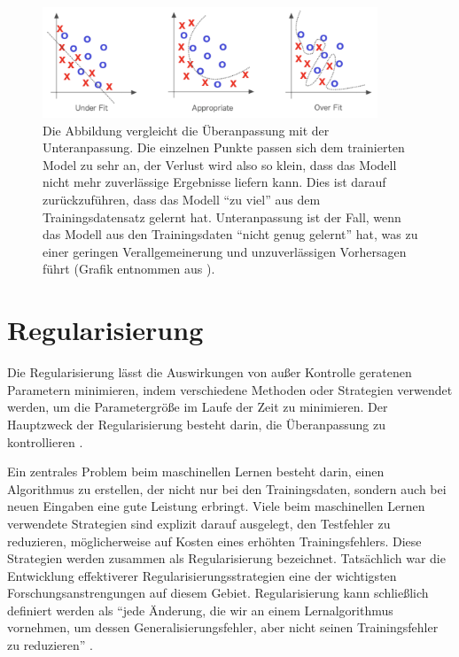         \begin{figure}[H]
            \centering
            \includegraphics[width=10cm]{kapitel2/overundefit.png}
            \caption[Vergleich der Unteranpassung mit der Überanpassung]{Die Abbildung vergleicht die Überanpassung mit der Unteranpassung. Die einzelnen Punkte passen sich dem trainierten Model zu sehr an, der Verlust wird also so klein, dass das Modell nicht mehr zuverlässige Ergebnisse liefern kann. Dies ist darauf zurückzuführen, dass das Modell \enquote{zu viel} aus dem Trainingsdatensatz gelernt hat. Unteranpassung ist der Fall, wenn das Modell aus den Trainingsdaten \enquote{nicht genug gelernt} hat, was zu einer geringen Verallgemeinerung und unzuverlässigen Vorhersagen führt (Grafik entnommen aus \cite*[27]{Patterson2019}). }
            \label{Kap2:OverUnder}
        \end{figure}

        \section{Regularisierung}\label{regSec}
        Die Regularisierung lässt die Auswirkungen von außer Kontrolle geratenen Parametern minimieren, indem verschiedene Methoden oder Strategien verwendet werden, um die Parametergröße im Laufe der Zeit zu minimieren. Der Hauptzweck der Regularisierung besteht darin, die Überanpassung zu kontrollieren \cite*[79]{Patterson2019}.

        Ein zentrales Problem beim maschinellen Lernen besteht darin, einen Algorithmus zu erstellen, der nicht nur bei den Trainingsdaten, sondern auch bei neuen Eingaben eine gute Leistung erbringt. Viele beim maschinellen Lernen verwendete Strategien sind explizit darauf ausgelegt, den Testfehler zu reduzieren, möglicherweise auf Kosten eines erhöhten Trainingsfehlers. Diese Strategien werden zusammen als Regularisierung bezeichnet. Tatsächlich war die Entwicklung effektiverer Regularisierungsstrategien eine der wichtigsten Forschungsanstrengungen auf diesem Gebiet. Regularisierung kann schließlich definiert werden als \enquote{jede Änderung, die wir an einem Lernalgorithmus vornehmen, um dessen Generalisierungsfehler, aber nicht seinen Trainingsfehler zu reduzieren} \cite*[228]{IanGoodfellowYoshuaBengio2016}.

